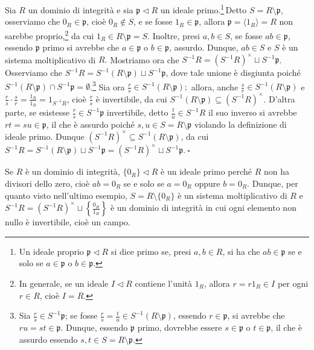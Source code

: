 \begin{exm}Sia $R$ un dominio di integrità e sia $\mathfrak{p}\lhd R$ un ideale primo.\footnote{Un ideale proprio $\mathfrak{p}\lhd R$ si dice primo se, presi $a,b\in R$, si ha che $ab\in \mathfrak{p}$ se e solo se $a\in \mathfrak{p}$ o $b\in \mathfrak{p}$.}\,Detto $S=R\setminus \mathfrak{p}$, osserviamo che $0_R\in \mathfrak{p}$, cioè $0_R\not\in S$, e se fosse $1_R \in\mathfrak{p}$, allora $\mathfrak{p}=\langle 1_R\rangle =R$ non sarebbe proprio,\footnote{In generale, se un ideale $I\lhd R$ contiene l'unità $1_R$, allora $r=r1_R\in I$ per ogni $r\in R$, cioè $I=R$.} da cui $1_R\in R\setminus \mathfrak{p}=S$. Inoltre, presi $a,b\in S$, se fosse $ab\in \mathfrak{p}$, essendo $\mathfrak{p}$ primo si avrebbe che $a\in \mathfrak{p}$ o $b\in\mathfrak{p}$, assurdo. Dunque, $ab\in S$ e $S$ è un sistema moltiplicativo di $R.$ Mostriamo ora che $S^{-1}R=(S^{-1}R)^{\times}\sqcup S^{-1}\mathfrak{p}$. Osserviamo che $S^{-1}R=S^{-1}(R\setminus \mathfrak{p}) \sqcup S^{-1}\mathfrak{p}$, dove tale unione è disgiunta poiché $S^{-1}(R\setminus \mathfrak{p}) \cap S^{-1}\mathfrak{p}=\emptyset$.\footnote{Sia $\frac{r}{s}\in S^{-1}\mathfrak{p}$; se fosse $\frac{r}{s}=\frac{t}{u}\in S^{-1}(R\setminus\mathfrak{p})$, essendo $r\in \mathfrak{p}$, si avrebbe che $ru=st\in \mathfrak{p}$. Dunque, essendo $\mathfrak{p}$ primo, dovrebbe essere $s\in \mathfrak{p}$ o $t\in\mathfrak{p}$, il che è assurdo essendo $s,t \in S=R\setminus\mathfrak{p}$.} Sia ora $\frac{r}{s}\in S^{-1}(R\setminus\mathfrak{p});$ allora, anche $\frac{s}{r}\in S^{-1}(R\setminus\mathfrak{p})$ e $\frac{r}{s}\cdot \frac{s}{r}=\frac{1_R}{1_R}=1_{S^{-1}R}$, cioè $\frac{r}{s}$ è invertibile, da cui $S^{-1}(R\setminus\mathfrak{p})\subseteq (S^{-1}R)^{\times}$. D'altra parte, se esistesse $\frac{r}{s}\in S^{-1}\mathfrak{p}$ invertibile, detto $\frac{t}{u}\in S^{-1}R$ il suo inverso si avrebbe $rt=su\in \mathfrak{p}$, il che è assurdo poiché $s,u \in S=R\setminus \mathfrak{p}$ violando la definizione di ideale primo. Dunque $(S^{-1}R)^{\times}\subseteq S^{-1}(R\setminus\mathfrak{p})$, da cui $S^{-1}R=S^{-1}(R\setminus \mathfrak{p}) \sqcup S^{-1}\mathfrak{p}=(S^{-1}R)^{\times}\sqcup S^{-1}\mathfrak{p}. \ \square$\end{exm}

\noindent Se $R$ è un dominio di integrità, $\{0_R\}\lhd R$ è un ideale primo perché $R$ non ha divisori dello zero, cioè $ab=0_R$ se e solo se $a=0_R$ oppure $b=0_R$. Dunque, per quanto visto nell'ultimo esempio, $S=R\setminus \{0_R\}$ è un sistema moltiplicativo di $R$ e $S^{-1}R=(S^{-1}R)^{\times} \sqcup \left\{ \frac{0_R}{1_R} \right\}$ è un dominio di integrità in cui ogni elemento non nullo è invertibile, cioè un campo.

